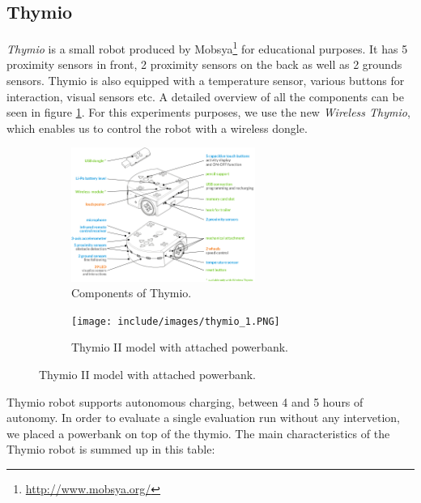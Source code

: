 \subsection{Thymio}

\emph{Thymio} \citep{mondada2017thymio} is a small robot produced by Mobsya\footnote{\url{http://www.mobsya.org/}} for educational purposes. It has 5 proximity sensors in front, 2 proximity sensors on the back as well as 2 grounds sensors. Thymio is also equipped with a temperature sensor, various buttons for interaction, visual sensors etc. A detailed overview of all the components can be seen in figure \ref{fig:thymio}. For this experiments purposes, we use the new \emph{Wireless Thymio}, which enables us to control the robot with a wireless dongle.

\begin{figure}[H]
    \centering
    \begin{subfigure}[b]{0.4\textwidth}
    	\centering
        \includegraphics[width=6cm]{include/images/thymio.PNG}
        \caption{Components of Thymio.}
        \label{fig:thymio}
    \end{subfigure}
    \begin{subfigure}[b]{0.4\textwidth}
    	\centering
        \texttt{[image: include/images/thymio\_1.PNG]}
        \caption{Thymio II model with attached powerbank.}
        \label{fig:real_thymio}
    \end{subfigure}
\end{figure}

Thymio robot supports autonomous charging, between 4 and 5 hours of autonomy. In order to evaluate a single evaluation run without any intervetion, we placed a powerbank on top of the thymio. The main characteristics of the Thymio robot is summed up in this table:


